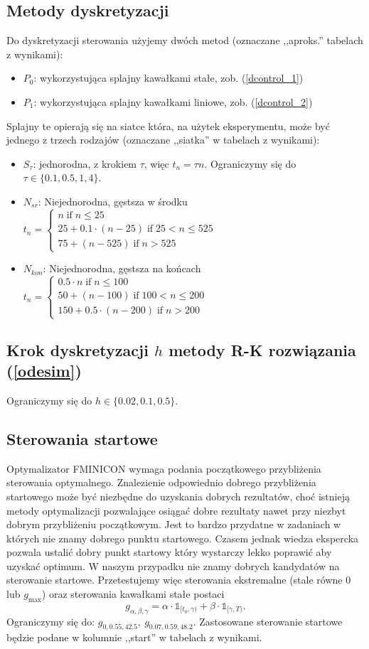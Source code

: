 \documentclass[licencjacka]{pracamgr}
\def\1{\mathds{1}}
\def\iif{\operatorname{if}}
\begin{document}
\subsection{Metody dyskretyzacji}
Do dyskretyzacji sterowania użyjemy dwóch metod (oznaczane ,,aproks.'' tabelach z wynikami):
\begin{itemize}
\item{$P_0$:} wykorzystująca splajny kawałkami stałe, zob. (\ref{dcontrol_1})
\item{$P_1$:} wykorzystująca splajny kawałkami liniowe, zob. (\ref{dcontrol_2})
\end{itemize}
Splajny te opierają się na siatce która, na użytek eksperymentu, może być jednego z trzech rodzajów (oznaczane ,,siatka'' w tabelach z wynikami):
\begin{itemize}
\item{$S_{\tau}$:} jednorodna, z krokiem $\tau$, więc $t_n = \tau n$. Ograniczymy się do $\tau \in \{0.1, 0.5, 1, 4\}$.
\item{$N_{sr}$: Niejednorodna, gęstsza w środku} $t_n = \begin{cases}
    n \iif n \le 25 \\
    25 + 0.1\cdot(n-25) \iif 25 < n \le 525 \\
    75 + (n - 525) \iif n > 525
  \end{cases}$
\item{$N_{kon}$: Niejednorodna, gęstsza na końcach} $t_n = \begin{cases}
    0.5\cdot n \iif n \le 100 \\
    50 + (n - 100) \iif 100 < n \le 200 \\
    150 + 0.5\cdot (n - 200) \iif n > 200
  \end{cases}$
\end{itemize}
\subsection{Krok dyskretyzacji $h$ metody R-K rozwiązania (\ref{odesim})}
Ograniczymy się do $h \in \{0.02, 0.1, 0.5\}$.
\subsection{Sterowania startowe}\label{start_control}
Optymalizator FMINICON wymaga podania początkowego przybliżenia sterowania optymalnego. Znalezienie odpowiednio dobrego przybliżenia startowego może być niezbędne do uzyskania dobrych rezultatów, choć istnieją metody optymalizacji pozwalające osiągać dobre rezultaty nawet przy niezbyt dobrym przybliżeniu początkowym. Jest to bardzo przydatne w zadaniach w których nie znamy dobrego punktu startowego. Czasem jednak wiedza ekspercka pozwala ustalić dobry punkt startowy który wystarczy lekko poprawić aby uzyskać optimum. W naszym przypadku nie znamy dobrych kandydatów na sterowanie startowe. Przetestujemy więc sterowania ekstremalne (stale równe 0 lub $g_{\max}$) oraz sterowania kawałkami stałe postaci
\[g_{\alpha,\beta,\gamma} = \alpha \cdot \1_{[t_0, \gamma)} + \beta \cdot \1_{[\gamma, T)}.\]
Ograniczymy się do: $g_{0,0.55,42.5},\ g_{0.07,0.59,48.2}$. Zastosowane sterowanie startowe będzie podane w kolumnie ,,start'' w tabelach z wynikami.
\end{document}
